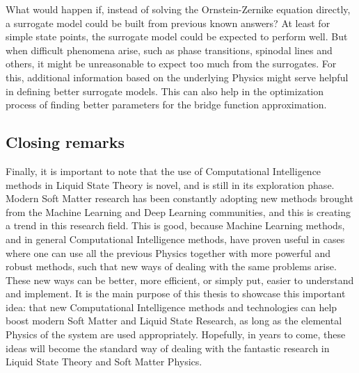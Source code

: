 What would happen if, instead of solving the Ornstein-Zernike equation directly, a 
surrogate model could be built from previous known answers? At least for simple state 
points, the surrogate model could be expected to perform well. But when difficult phenomena 
arise, such as phase transitions, spinodal lines and others, it might be unreasonable to 
expect too much from the surrogates. For this, additional information based on the 
underlying Physics might serve helpful in defining better surrogate models. This can also 
help in the optimization process of finding better parameters for the bridge function 
approximation.

\subsection{Closing remarks}
Finally, it is important to note that the use of Computational Intelligence methods in 
Liquid State Theory is novel, and is still in its exploration phase. Modern Soft Matter 
research has been constantly adopting new methods brought from the Machine Learning and 
Deep Learning communities, and this is creating a trend in this research field. This is 
good, because Machine Learning methods, and in general Computational Intelligence methods, 
have proven useful in cases where one can use all the previous Physics together with more 
powerful and robust methods, such that new ways of dealing with the same problems arise. 
These new ways can be better, more efficient, or simply put, easier to understand and 
implement. It is the main purpose of this thesis to showcase this important idea: that new 
Computational Intelligence methods and technologies can help boost modern Soft Matter and 
Liquid State Research, as long as the elemental Physics of the system are used 
appropriately. Hopefully, in years to come, these ideas will become the standard way of 
dealing with the fantastic research in Liquid State Theory and Soft Matter Physics.